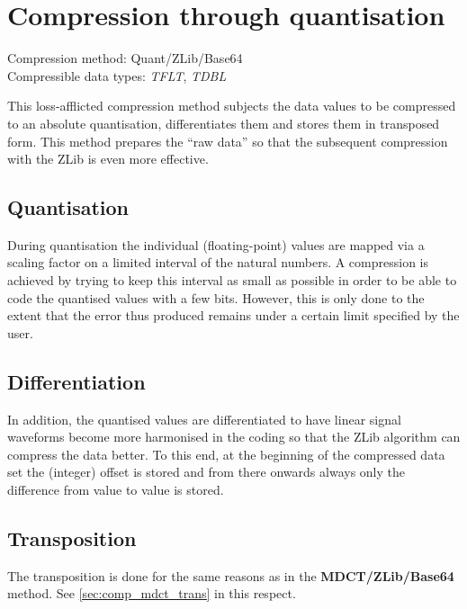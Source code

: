 \documentclass[a4paper,12pt,BCOR6mm,bibtotoc,idxtotoc]{scrbook}
\begin{document}

\section{Compression through quantisation} \label{sec:comp_quant} 

Compression method: Quant/ZLib/Base64\\ Compressible data types: \textit{TFLT}, \textit{TDBL}

This loss-afflicted compression method subjects the data values to be compressed to an absolute quantisation, differentiates them and stores them in transposed form. This method prepares the ``raw data'' so that the subsequent compression with the ZLib is even more effective.

\subsection{Quantisation}

During quantisation the individual (floating-point) values are mapped via a scaling factor on a limited interval of the natural numbers. A compression is achieved by trying to keep this interval as small as possible in order to be able to code the quantised values with a few bits. However, this is only done to the extent that the error thus produced remains under a certain limit specified by the user.

\subsection{Differentiation}

In addition, the quantised values are differentiated to have linear signal waveforms become more harmonised in the coding so that the ZLib algorithm can compress the data better. To this end, at the beginning of the compressed data set the (integer) offset is stored and from there onwards always only the difference from value to value is stored.

\subsection{Transposition}

The transposition is done for the same reasons as in the
\textbf{MDCT/ZLib/Base64} method. See \autoref{sec:comp_mdct_trans} in this
respect.
\end{document}
